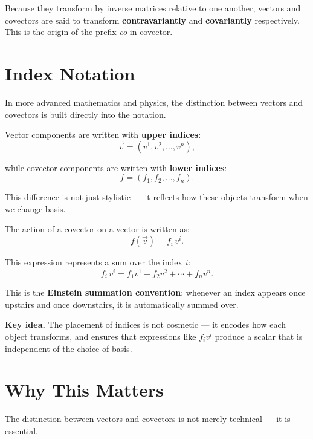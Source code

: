 \documentclass[11pt,openany]{book}
\theoremstyle{definition}
\begin{document}
Because they transform by inverse matrices relative to one another, vectors and 
covectors are said to transform \textbf{contravariantly} and \textbf{covariantly} 
respectively. This is the origin of the prefix \textit{co} in covector.

\section{Index Notation}

In more advanced mathematics and physics, the distinction between vectors and 
covectors is built directly into the notation.

\medskip

Vector components are written with \textbf{upper indices}:
\[
\vec{v} = (v^1, v^2, \ldots, v^n),
\]

while covector components are written with \textbf{lower indices}:
\[
f = (f_1, f_2, \ldots, f_n).
\]

\medskip

This difference is not just stylistic --- it reflects how these objects transform 
when we change basis.

\medskip

The action of a covector on a vector is written as:
\[
f(\vec{v}) = f_i\, v^i.
\]

\medskip

This expression represents a sum over the index $i$:
\[
f_i\, v^i = f_1 v^1 + f_2 v^2 + \cdots + f_n v^n.
\]

\medskip

This is the \textbf{Einstein summation convention}: whenever an index appears 
once upstairs and once downstairs, it is automatically summed over.

\medskip

\textbf{Key idea.} The placement of indices is not cosmetic --- it encodes how 
each object transforms, and ensures that expressions like $f_i v^i$ produce a 
scalar that is independent of the choice of basis.

\section{Why This Matters}

The distinction between vectors and covectors is not merely technical --- it is 
essential.
\end{document}
